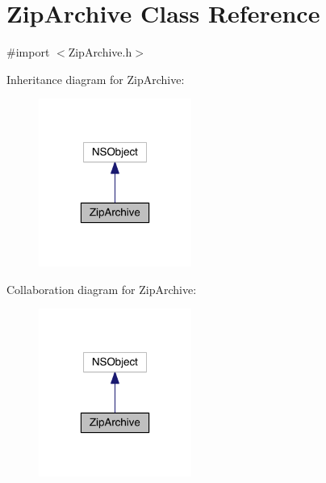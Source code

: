 \hypertarget{interface_zip_archive}{\section{Zip\+Archive Class Reference}
\label{interface_zip_archive}
}


{\ttfamily \#import $<$Zip\+Archive.\+h$>$}



Inheritance diagram for Zip\+Archive\+:\nopagebreak
\begin{figure}[H]
\begin{center}
\leavevmode
\includegraphics[width=142pt]{df/d50/interface_zip_archive__inherit__graph}
\end{center}
\end{figure}


Collaboration diagram for Zip\+Archive\+:\nopagebreak
\begin{figure}[H]
\begin{center}
\leavevmode
\includegraphics[width=142pt]{d1/de3/interface_zip_archive__coll__graph}
\end{center}
\end{figure}
